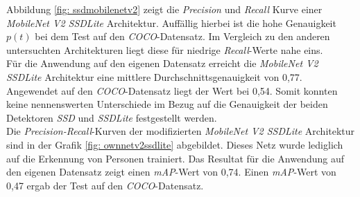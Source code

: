 

Abbildung \ref{fig: ssdmobilenetv2} zeigt die \textit{Precision} und \textit{Recall} Kurve einer \textit{MobileNet V2 SSDLite} Architektur. Auffällig hierbei ist die hohe Genauigkeit $p(t)$ bei dem Test auf den \textit{COCO}-Datensatz. Im Vergleich zu den anderen untersuchten Architekturen liegt diese für niedrige \textit{Recall}-Werte nahe eins.\\

 Für die Anwendung auf den eigenen Datensatz erreicht die \textit{MobileNet V2 SSDLite} Architektur eine mittlere Durchschnittsgenauigkeit von 0,77. Angewendet auf den \textit{COCO}-Datensatz liegt der Wert bei 0,54. Somit konnten  keine nennenswerten Unterschiede im Bezug auf die Genauigkeit der beiden Detektoren \textit{SSD} und \textit{SSDLite} festgestellt werden. \\
 
 Die \textit{Precision-Recall}-Kurven der modifizierten \textit{MobileNet V2 SSDLite} Architektur sind in der Grafik \ref{fig: ownnetv2ssdlite} abgebildet. Dieses Netz wurde lediglich auf die Erkennung von Personen trainiert. Das Resultat für die Anwendung auf den eigenen Datensatz zeigt einen \textit{mAP}-Wert von 0,74. Einen \textit{mAP}-Wert von 0,47 ergab der Test auf den \textit{COCO}-Datensatz.\\ 

 

 
  


